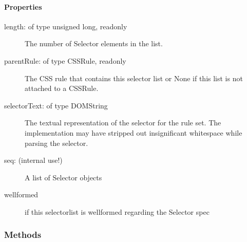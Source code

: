 \paragraph*{Properties}
\label{properties}
\begin{description}
\item[{length: of type unsigned long, readonly}] \leavevmode 
The number of Selector elements in the list.

\item[{parentRule: of type CSSRule, readonly}] \leavevmode 
The CSS rule that contains this selector list or None if this
list is not attached to a CSSRule.

\item[{selectorText: of type DOMString}] \leavevmode 
The textual representation of the selector for the rule set. The
implementation may have stripped out insignificant whitespace while
parsing the selector.

\item[{seq: (internal use!)}] \leavevmode 
A list of Selector objects

\item[{wellformed}] \leavevmode 
if this selectorlist is wellformed regarding the Selector spec

\end{description}


  \subsubsection{Methods}

    \vspace{0.5ex}

